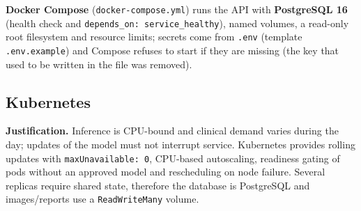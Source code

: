 \documentclass[12pt,a4paper]{article}
\newcommand{\fp}[1]{\nolinkurl{#1}}
\begin{document}
\noindent \textbf{Docker Compose} (\fp{docker-compose.yml}) runs the API with \textbf{PostgreSQL 16}
(health check and \texttt{depends\_on: service\_healthy}), named volumes, a read-only root filesystem and resource limits; secrets come
from \texttt{.env} (template \texttt{.env.example}) and Compose refuses to start if they are missing (the key that used to be written in the file was removed).

\subsection{Kubernetes}

\textbf{Justification.} Inference is CPU-bound and clinical demand varies during the day; updates of the
model must not interrupt service. Kubernetes provides rolling updates with \texttt{maxUnavailable: 0},
CPU-based autoscaling, readiness gating of pods without an approved model and rescheduling on node
failure. Several replicas require shared state, therefore the database is PostgreSQL and images/reports
use a \texttt{ReadWriteMany} volume.
\end{document}
